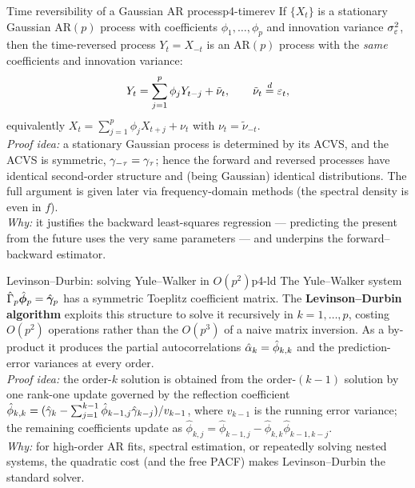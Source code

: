 \begin{proposition}{Time reversibility of a Gaussian AR process}{p4-timerev}
If $\{X_t\}$ is a stationary Gaussian AR$(p)$ process with coefficients
$\phi_1,\dots,\phi_p$ and innovation variance $\sigma_\varepsilon^2$, then the
time-reversed process $Y_t=X_{-t}$ is an AR$(p)$ process with the
\emph{same} coefficients and innovation variance:
\[
Y_t=\sum_{j=1}^p\phi_jY_{t-j}+\tilde\nu_t,\qquad \tilde\nu_t\overset{d}{=}\varepsilon_t,
\]
equivalently $X_t=\sum_{j=1}^p\phi_jX_{t+j}+\nu_t$ with $\nu_t=\tilde\nu_{-t}$.\\[2pt]
\textit{Proof idea:} a stationary Gaussian process is determined by its ACVS,
and the ACVS is symmetric, $\gamma_{-\tau}=\gamma_\tau$; hence the forward and
reversed processes have identical second-order structure and (being Gaussian)
identical distributions. The full argument is given later via frequency-domain
methods (the spectral density is even in $f$).\\
\textit{Why:} it justifies the backward least-squares regression --- predicting
the present from the future uses the very same parameters --- and underpins the
forward--backward estimator.
\end{proposition}

\begin{proposition}{Levinson--Durbin: solving Yule--Walker in $O(p^2)$}{p4-ld}
The Yule--Walker system
$\hat\Gamma_p\hat{\boldsymbol\phi}_p=\hat{\boldsymbol{\gamma}}_p$ has a symmetric
Toeplitz coefficient matrix. The \textbf{Levinson--Durbin algorithm} exploits
this structure to solve it recursively in $k=1,\dots,p$, costing $O(p^2)$
operations rather than the $O(p^3)$ of a naive matrix inversion. As a
by-product it produces the partial autocorrelations
$\hat{\alpha}_k=\hat\phi_{k,k}$ and the prediction-error variances at every order.\\[2pt]
\textit{Proof idea:} the order-$k$ solution is obtained from the order-$(k-1)$
solution by one rank-one update governed by the reflection coefficient
$\hat\phi_{k,k}=(\hat{\gamma}_k-\sum_{j=1}^{k-1}\hat\phi_{k-1,j}\hat{\gamma}_{k-j})/
v_{k-1}$, where $v_{k-1}$ is the running error variance; the remaining
coefficients update as
$\hat\phi_{k,j}=\hat\phi_{k-1,j}-\hat\phi_{k,k}\hat\phi_{k-1,k-j}$.\\
\textit{Why:} for high-order AR fits, spectral estimation, or repeatedly
solving nested systems, the quadratic cost (and the free PACF) makes
Levinson--Durbin the standard solver.
\end{proposition}

